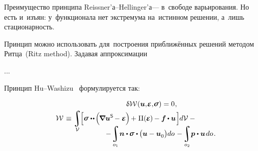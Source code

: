 \begin{otherlanguage}{russian}

Преимущество принципа Reissner’а\hbox{--}Hellinger’а\:--- в~свободе варьирования.
Но есть и~изъян: у~функционала нет экстремума на~истинном решении, а~лишь стационарность.

Принцип можно использовать для~построения приближённых решений методом Ритца~(Ritz method).
Задавая аппроксимации

...

Принцип Hu\hbox{--}Washizu~\cite{washizubook} формулируется так:

\nopagebreak\vspace{-0.2em}\begin{multline}\label{huwashizuvariationalprinciple}
\hfil \variation{\mathcal{W}} \hspace{.1ex} (\bm{u}, \hspace{-0.32ex}\infinitesimaldeformation, \hspace{-0.32ex}\linearstress) = 0
\hspace{.1ex} ,
\\[-0.1em]
%
\shoveleft{\displaystyle \mathcal{W} \hspace{.2ex} \equiv
\displaystyle\integral\displaylimits_{\mathcal{V}} \hspace{-0.3ex}
\Bigl[
\linearstress \dotdotp \hspace{-0.2ex} \Bigl( \hspace{-0.2ex} \boldnabla {\bm{u}}^{\mathsf{S}} \hspace{-0.2ex} - \infinitesimaldeformation \hspace{-0.1ex} \Bigr) \hspace{-0.2ex} + \hspace{.1ex} \potential(\hspace{-0.1ex}\infinitesimaldeformation\hspace{-0.1ex})\hspace{-0.1ex} -
\bm{f} \hspace{-0.1ex} \dotp \bm{u}
\hspace{.2ex} \Bigr] \hspace{-0.1ex} d\mathcal{V} \hspace{.5ex}
- \hfill}
\\[-1.2em]
%
\hspace{8em}
- \hspace{-0.2ex} \displaystyle\integral\displaylimits_{o_1} \hspace{-0.4ex} \unitnormalvector \dotp \hspace{-0.1ex} \linearstress \dotp \hspace{-0.1ex} \bigl( \bm{u} - \bm{u}_{\raisemath{-0.1em}{0}} \bigr) do \hspace{.2ex}
- \hspace{-0.2ex} \integral\displaylimits_{o_2} \hspace{-0.4ex} \bm{p} \dotp \bm{u} \hspace{.25ex} do
\hspace{.2ex} .
\end{multline}


\end{otherlanguage}
